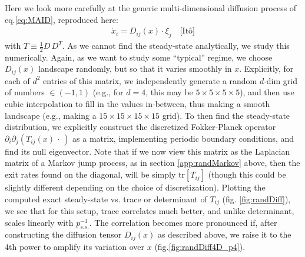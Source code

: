 \documentclass[reprint,prx]{revtex4-1}
\newcommand{\tr}{\mbox{tr}}
\renewcommand{\=}[1]{\stackrel{#1}{=}} %
\renewcommand{\(}{\left (}
\renewcommand{\)}{\right  )}
\renewcommand{\[}{\left [}
\renewcommand{\]}{\right ]}
\newcommand{\<}{\left <}
\renewcommand{\>}{\right >}
\theoremstyle{definition}
\theoremstyle{remark}
\begin{document}
Here we look more carefully at the generic multi-dimensional diffusion process of eq.\ref{eq:MAID}, reproduced here:
\begin{align} \label{eq:MAID1}
\dot{x}_i = D_{ij}(x)\cdot \xi_j \quad \mbox{[It\^o]}
\end{align} 
with $ T\equiv \frac{1}{2}D\,D^T $. As we cannot find the steady-state analytically, we study this numerically. Again, as we want to study some ``typical'' regime, we choose $ D_{ij}(x) $ landscape randomly, but so that it varies smoothly in $ x $. Explicitly, for each of $ d^2 $ entries of this matrix, we independently generate a random $ d $-dim grid of numbers $ \in(-1,1) $ (e.g., for $ d=4 $, this may be $ 5\times5\times5\times5 $), and then use cubic interpolation to fill in the values in-between, thus making a smooth landscape (e.g., making a $ 15\times15\times15\times15 $ grid). To then find the steady-state distribution, we explicitly construct the discretized Fokker-Planck operator $ \partial_i\partial_j\(T_{ij}(x) \,\cdot\,\) $ as a matrix, implementing periodic boundary conditions, and find its null eigenvector. Note that if we now view this matrix as the Laplacian matrix of a Markov jump process, as in section \ref{app:randMarkov} above, then the exit rates found on the diagonal, will be simply $ \tr\[T_{ij}\] $ (though this could be slightly different depending on the choice of discretization). Plotting the computed exact steady-state vs. trace or determinant of $ T_{ij} $ (fig. \ref{fig:randDiff}), we see that for this setup, trace correlates much better, and unlike determinant, scales linearly with $ p_{s.s.}^{-1} $. The correlation becomes more pronounced if, after constructing the diffusion tensor $ D_{ij}(x) $ as described above, we raise it to the 4th power to amplify its variation over $ x $ (fig.\ref{fig:randDiff4D_p4}).
\end{document}
